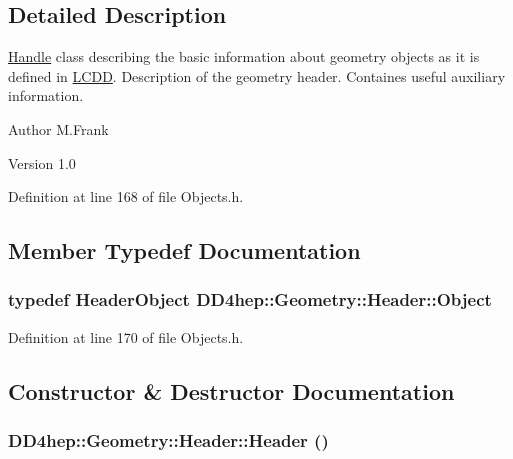 \subsection{Detailed Description}
\hyperlink{class_d_d4hep_1_1_handle}{Handle} class describing the basic information about geometry objects as it is defined in \hyperlink{class_d_d4hep_1_1_geometry_1_1_l_c_d_d}{LCDD}. Description of the geometry header. Containes useful auxiliary information.

\begin{DoxyAuthor}{Author}
M.Frank 
\end{DoxyAuthor}
\begin{DoxyVersion}{Version}
1.0 
\end{DoxyVersion}


Definition at line 168 of file Objects.h.

\subsection{Member Typedef Documentation}
\hypertarget{class_d_d4hep_1_1_geometry_1_1_header_a8cb46876d46f57257201a561bb1e0795}{
\subsubsection[{Object}]{\setlength{\rightskip}{0pt plus 5cm}typedef {\bf HeaderObject} {\bf DD4hep::Geometry::Header::Object}}}
\label{class_d_d4hep_1_1_geometry_1_1_header_a8cb46876d46f57257201a561bb1e0795}


Definition at line 170 of file Objects.h.

\subsection{Constructor \& Destructor Documentation}
\hypertarget{class_d_d4hep_1_1_geometry_1_1_header_a577016069dd076aa2127e4ee0c60eb7c}{
\subsubsection[{Header}]{\setlength{\rightskip}{0pt plus 5cm}DD4hep::Geometry::Header::Header ()}}
\label{class_d_d4hep_1_1_geometry_1_1_header_a577016069dd076aa2127e4ee0c60eb7c}



